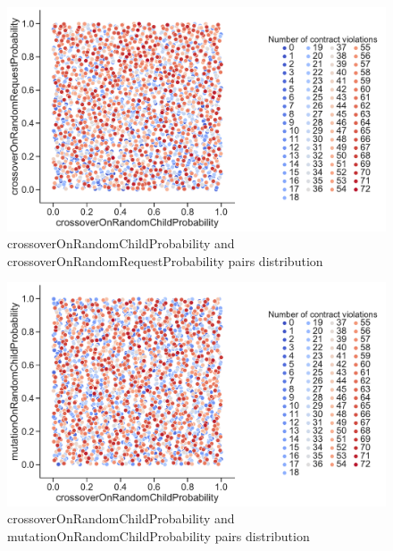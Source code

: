 \begin{figure}
	\centering
	\includegraphics[width=\textwidth]{images/PairsDistr/crossoverOnRandomChildProbability_crossoverOnRandomRequestProbability.pdf}
	\caption[crossoverOnRandomChildProbability and crossoverOnRandomRequestProbability pairs distribution]{crossoverOnRandomChildProbability and crossoverOnRandomRequestProbability pairs distribution}
	\label{fig:crossoverOnRandomChildProbability_crossoverOnRandomRequestProbability_pair}
\end{figure}
\clearpage
\begin{figure}
	\centering
	\includegraphics[width=\textwidth]{images/PairsDistr/crossoverOnRandomChildProbability_mutationOnRandomChildProbability.pdf}
	\caption[crossoverOnRandomChildProbability and mutationOnRandomChildProbability pairs distribution]{crossoverOnRandomChildProbability and mutationOnRandomChildProbability pairs distribution}
	\label{fig:crossoverOnRandomChildProbability_mutationOnRandomChildProbability_pair}
\end{figure}
\clearpage
